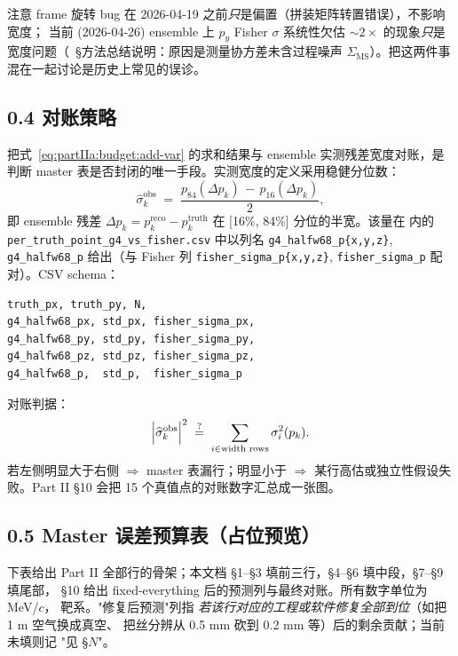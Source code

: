 注意 frame 旋转 bug 在 2026-04-19 之前\emph{只}是偏置（拼装矩阵转置错误），不影响宽度；
当前 (2026-04-26) ensemble 上 $p_y$ Fisher $\sigma$ 系统性欠估 $\sim 2\times$ 的现象\emph{只}是宽度问题（\StatusReport{}~§方法总结说明：原因是测量协方差未含过程噪声 $\Sigma_\mathrm{MS}$）。把这两件事混在一起讨论是历史上常见的误诊。

\subsection*{0.4 对账策略}

把式~\eqref{eq:partIIa:budget:add-var} 的求和结果与 ensemble 实测残差宽度对账，是判断 master 表是否封闭的唯一手段。实测宽度的定义采用稳健分位数：
\begin{equation}
  \widehat{\sigma}_k^\mathrm{obs}
  \;=\;\frac{p_{84}(\Delta p_k)\,-\,p_{16}(\Delta p_k)}{2},
  \label{eq:partIIa:budget:halfw68}
\end{equation}
即 ensemble 残差 $\Delta p_k = p_k^\mathrm{reco} - p_k^\mathrm{truth}$ 在 [16\%, 84\%] 分位的半宽。该量在 \DeepDiveData{} 内的 \texttt{per\_truth\_point\_g4\_vs\_fisher.csv} 中以列名 \texttt{g4\_halfw68\_p\{x,y,z\}}, \texttt{g4\_halfw68\_p} 给出（与 Fisher 列 \texttt{fisher\_sigma\_p\{x,y,z\}}, \texttt{fisher\_sigma\_p} 配对）。CSV schema：
\begin{verbatim}
truth_px, truth_py, N,
g4_halfw68_px, std_px, fisher_sigma_px,
g4_halfw68_py, std_py, fisher_sigma_py,
g4_halfw68_pz, std_pz, fisher_sigma_pz,
g4_halfw68_p,  std_p,  fisher_sigma_p
\end{verbatim}
对账判据：
\begin{equation}
  \Bigl|\widehat{\sigma}_k^\mathrm{obs}\Bigr|^2
  \;\stackrel{?}{=}\;\sum_{i\in\text{width rows}} \sigma_i^2(p_k).
  \label{eq:partIIa:budget:closure}
\end{equation}
若左侧明显大于右侧 $\Rightarrow$ master 表漏行；明显小于 $\Rightarrow$ 某行高估或独立性假设失败。Part II §10 会把 15 个真值点的对账数字汇总成一张图。

\subsection*{0.5 Master 误差预算表（占位预览）}

下表给出 Part II 全部行的骨架；本文档 §1--§3 填前三行，§4--§6 填中段，§7--§9 填尾部，
§10 给出 fixed-everything 后的预测列与最终对账。所有数字单位为 MeV/$c$，
靶系。"修复后预测"列指 \emph{若该行对应的工程或软件修复全部到位}（如把 1 m 空气换成真空、
把丝分辨从 0.5 mm 砍到 0.2 mm 等）后的剩余贡献；当前未填则记 "见 §$N$"。

